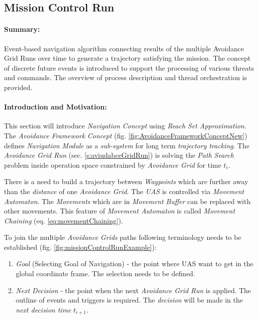 \newpage
\subsection{Mission Control Run}\label{s:missionControlRun}

\paragraph{Summary:} Event-based navigation algorithm connecting results of the multiple Avoidance Grid Runs over time to generate a trajectory satisfying the mission. The concept of discrete future events is introduced to support the processing of various threats and commands. The overview of process description and thread orchestration is provided.


\paragraph{Introduction and Motivation:}  This section will introduce \emph{Navigation Concept} using  \emph{Reach Set Approximation}. The \emph{Avoidance Framework Concept} (fig. \ref{fig:AvoidanceFrameworkConceptNew}) defines \emph{Navigation Module} as a \emph{sub-system} for long term \emph{trajectory tracking}.  The \emph{Avoidance Grid Run} (sec. \ref{s:aviudabceGridRun}) is solving the \emph{Path Search} problem inside operation space constrained by \emph{Avoidance Grid} for time $t_i$. 

There is a need to build a trajectory between \emph{Waypoints} which are further away than the \emph{distance} of one \emph{Avoidance Grid}.  The \emph{UAS} is controlled via \emph{Movement Automaton}. The \emph{Movements} which are in \emph{Movement Buffer} can be replaced with other movements. This feature of \emph{Movement Automaton} is called \emph{Movement Chaining} (eq. \ref{eq:movementChaining}).

To join the multiple \emph{Avoidance Grids} paths following terminology needs to be established (fig. \ref{fig:missionControlRunExample}):
\begin{enumerate}
    \item \emph{Goal} (Selecting Goal of Navigation) - the point where UAS want to get in the global coordinate frame. The selection needs to be defined.
    
    \item \emph{Next Decision} - the point when the next \emph{Avoidance Grid Run} is applied. The outline of events and triggers is required. The \emph{decision} will be made in the \emph{next decision time} $t_{i+1}$.
\end{enumerate}

